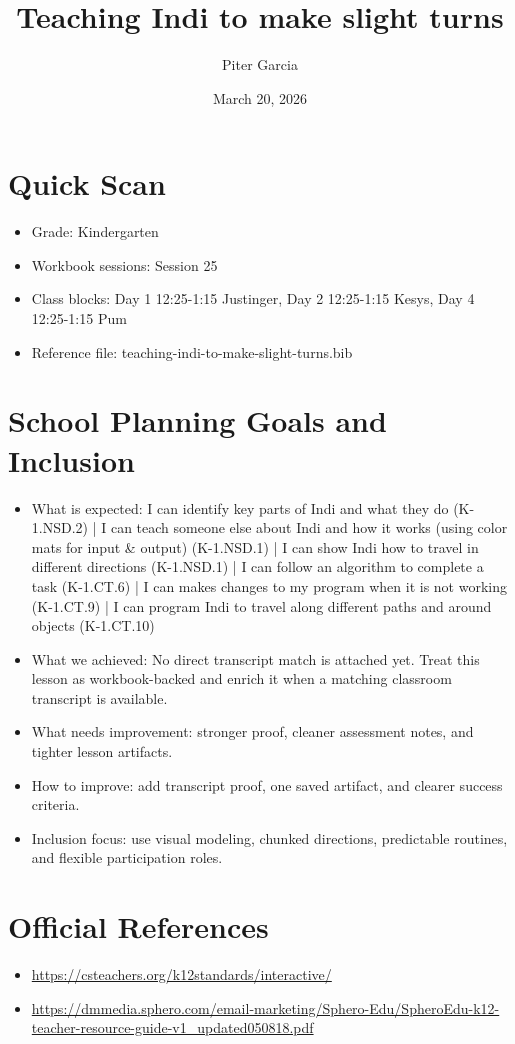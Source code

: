 \documentclass[11pt]{article}
\title{Teaching Indi to make slight turns}
\author{Piter Garcia}
\date{March 20, 2026}
\begin{document}
    \maketitle
    \section*{Quick Scan}
    \begin{itemize}[leftmargin=*]
    \item Grade: Kindergarten
    \item Workbook sessions: Session 25
    \item Class blocks: Day 1 12:25-1:15 Justinger, Day 2 12:25-1:15 Kesys, Day 4 12:25-1:15 Pum
    \item Reference file: teaching-indi-to-make-slight-turns.bib
    \end{itemize}
    \section*{School Planning Goals and Inclusion}
    \begin{itemize}[leftmargin=*]
    \item What is expected: I can identify key parts of Indi and what they do (K-1.NSD.2) | I can teach someone else about Indi and how it works (using color mats for input & output) (K-1.NSD.1) | I can show Indi how to travel in different directions (K-1.NSD.1) | I can follow an algorithm to complete a task (K-1.CT.6) | I can makes changes to my program when it is not working (K-1.CT.9) | I can program Indi to travel along different paths and around objects (K-1.CT.10)
    \item What we achieved: No direct transcript match is attached yet. Treat this lesson as workbook-backed and enrich it when a matching classroom transcript is available.
    \item What needs improvement: stronger proof, cleaner assessment notes, and tighter lesson artifacts.
    \item How to improve: add transcript proof, one saved artifact, and clearer success criteria.
    \item Inclusion focus: use visual modeling, chunked directions, predictable routines, and flexible participation roles.
    \end{itemize}
    \section*{Official References}
    \begin{itemize}[leftmargin=*]
    \item \url{https://csteachers.org/k12standards/interactive/}
\item \url{https://dmmedia.sphero.com/email-marketing/Sphero-Edu/SpheroEdu-k12-teacher-resource-guide-v1_updated050818.pdf}

    \end{itemize}
    
\end{document}
